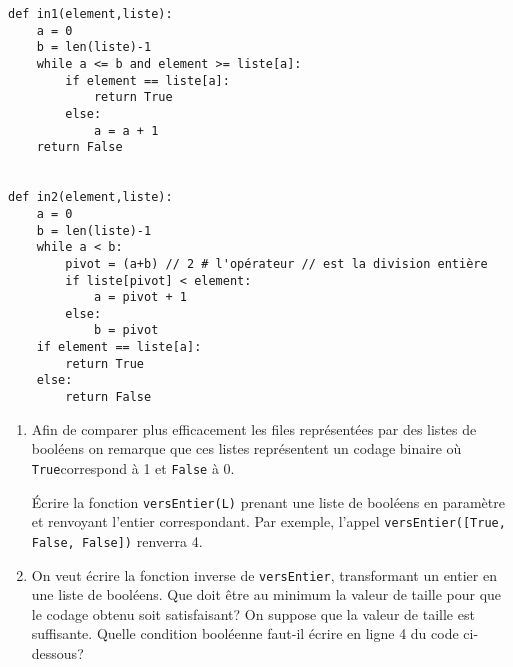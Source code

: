 



\begin{lstlisting}
def in1(element,liste):
    a = 0
    b = len(liste)-1
    while a <= b and element >= liste[a]:
        if element == liste[a]:
            return True
        else:
            a = a + 1
    return False


def in2(element,liste):
    a = 0
    b = len(liste)-1
    while a < b:
        pivot = (a+b) // 2 # l'opérateur // est la division entière
        if liste[pivot] < element:
            a = pivot + 1
        else:
            b = pivot
    if element == liste[a]:
        return True
    else:
        return False
\end{lstlisting}




\begin{enumerate}[label=\ding{111}\textbf{ Q\arabic*} -- ,wide=0pt,resume]
	\item Afin de comparer plus efficacement les files représentées par des listes de booléens on
remarque que ces listes représentent un codage binaire où \lstinline{True}correspond à 1 et \lstinline{False} à 0.

\'Ecrire la fonction \lstinline{versEntier(L)} prenant une liste de booléens en paramètre et renvoyant l'entier
correspondant. Par exemple, l'appel \lstinline{versEntier([True, False, False])} renverra 4.
\item  On veut écrire la fonction inverse de \lstinline{versEntier}, transformant un entier en une liste de
booléens. Que doit être au minimum la valeur de taille pour que le codage obtenu soit satisfaisant?
On suppose que la valeur de taille est suffisante. Quelle condition booléenne faut-il écrire en ligne
4 du code ci-dessous?
\end{enumerate}

